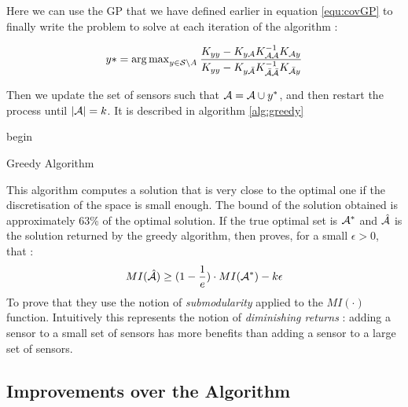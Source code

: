 Here we can use the GP that we have defined earlier in equation \ref{equ:covGP} to finally write the problem to solve at each iteration of the algorithm : 

\begin{equation}
    y*  = {\arg \max}_{y \in \mathcal{S} \backslash A } \: \frac{K_{yy} - K_{y\mathcal{A}} K_{\mathcal{A}\mathcal{A}}^{-1} K_{\mathcal{A} y} }{K_{yy} - K_{y\bar{\mathcal{A}}} K_{\bar{\mathcal{A}}\bar{\mathcal{A}}}^{-1} K_{\bar{\mathcal{A}} y} } \label{equ:updateGreedy}
\end{equation}

Then we update the set of sensors such that $\mathcal{A} = \mathcal{A} \cup y^*$, and then restart the process until $|\mathcal{A}| = k$. It is described in algorithm \ref{alg:greedy}  \\

\begin{algorithm}[h]
 begin\;
 \caption{Greedy Algorithm}
 \label{alg:greedy}
\end{algorithm}


This algorithm computes a solution that is very close to the optimal one if the discretisation of the space is small enough. The bound of the solution obtained is approximately 63\% of the optimal solution. If the true optimal set is $\mathcal{A}^*$ and $\hat{\mathcal{A}}$ is the solution returned by the greedy algorithm, then \citet{krause_near-optimal_2008} proves, for a small $\epsilon >0 $, that : 
 \begin{equation}
    MI(\hat{\mathcal{A}}) \geq (1 - \frac{1}{e}) \cdot MI(\mathcal{A}^*) - k\epsilon
\end{equation}
To prove that they use the notion of \textit{submodularity} \citep{nemhauser_analysis_1978} applied to the $MI(\cdot)$ function. Intuitively this represents the notion of \textit{diminishing returns} :  adding a sensor to a small set of sensors has more benefits than adding a sensor to a large set of sensors. 


\subsection{Improvements over the Algorithm}


